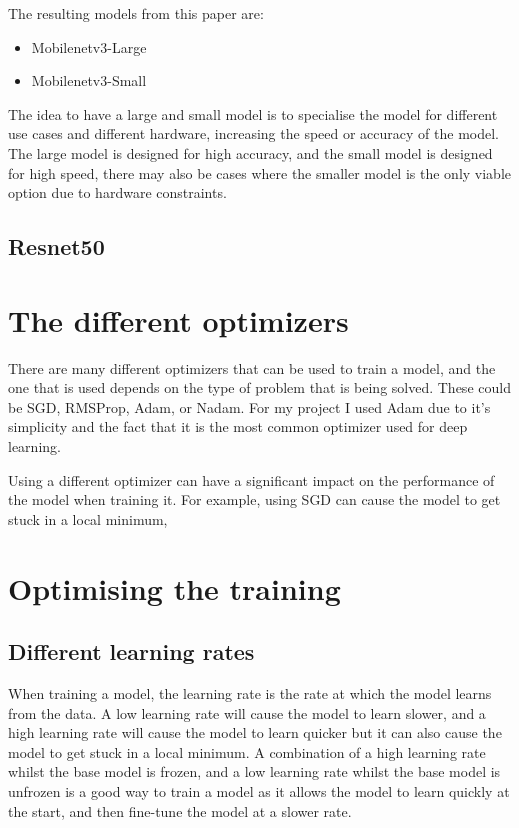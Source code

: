 \documentclass[]{final_report}
\begin{document}
The resulting models from this paper are:
\begin{itemize}
    \item Mobilenetv3-Large
    \item Mobilenetv3-Small
\end{itemize}

The idea to have a large and small model is to specialise the model for different use cases and different hardware, increasing the speed or accuracy of the model.
The large model is designed for high accuracy, and the small model is designed for high speed, there may also be cases where the smaller model is the only viable option due to hardware constraints.




\section{Resnet50}

\chapter{The different optimizers}

There are many different optimizers that can be used to train a model, and the one 
that is used depends on the type of problem that is being solved.
These could be SGD, RMSProp, Adam, or Nadam. For my project I used 
Adam due to it's simplicity and the fact that it is the most common 
optimizer used for deep learning.

Using a different optimizer can have a significant impact on the performance of the model when training it.
For example, using SGD can cause the model to get stuck in a local minimum, %

\chapter{Optimising the training}

\section{Different learning rates}

When training a model, the learning rate is the rate at which the model learns from the data.
A low learning rate will cause the model to learn slower, and a high learning rate will cause the model to learn quicker
but it can also cause the model to get stuck in a local minimum. A combination of a high learning rate whilst the base model is frozen,
and a low learning rate whilst the base model is unfrozen is a good way to train a model as it allows the model to learn quickly at the start,
and then fine-tune the model at a slower rate. 
\end{document}
